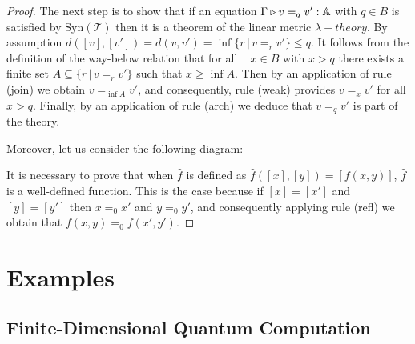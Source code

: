 \documentclass[10pt,a4paper]{amsart}
\theoremstyle{definition}
\theoremstyle{definition}
\theoremstyle{definition}
\theoremstyle{definition}
\theoremstyle{definition}
\theoremstyle{definition}
\begin{document}
\begin{proof}
  The next step is to show that if an equation $\Gamma \triangleright v =_q v' : \mathbb{A}$ with $q \in B$ is satisfied by Syn$(\mathscr{T})$ then it is a theorem of the linear metric $\lambda-theory$. By assumption $d([v],[v']) = d(v,v') =  \inf{ \{r \, \vert \, v =_r v'\}} \leq q$. It follows from the definition of the way-below relation that for all
  $x \in B$ with $x>q$ there exists a finite set $A \subseteq \{r \, \vert \, v =_r v'\}$ such that $x \geq \inf{A}$. Then by an
 application of rule (join) we obtain $v =_{\inf{A}} v'$, and consequently, rule (weak) provides $v =_x v'$ for all $x > q$. Finally, by an application of rule (arch) we deduce that $v =_q v'$ is part of the theory.

  Moreover, let us consider the following diagram:

  \vspace{10pt}



It is necessary to prove that when $\hat{f}$ is defined as $\hat{f}([x],[y]) = [f(x,y)]$, $\hat{f}$ is a well-defined function. This is the case because if $[x] = [x']$ and $[y] = [y']$ then $x =_0 x'$ and $y =_0 y'$, and consequently applying rule  (refl) we obtain that $f(x,y) =_0 f(x',y')$.
\end{proof} 


\section{Examples}

\subsection{Finite-Dimensional Quantum Computation}

\end{document}
